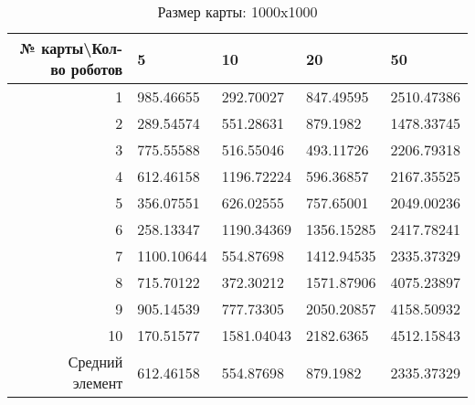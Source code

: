 \begin{table}[H]
\centering
\begin{tabular}{|r|l|l|l|l|}
\hline
№ карты\textbackslash Кол-во роботов & \textbf{5} & \textbf{10} & \textbf{20} & \textbf{50}\\ \hline
1 & 985.46655 & 292.70027 & 847.49595 & 2510.47386\\ \hline
2 & 289.54574 & 551.28631 & 879.1982 & 1478.33745\\ \hline
3 & 775.55588 & 516.55046 & 493.11726 & 2206.79318\\ \hline
4 & 612.46158 & 1196.72224 & 596.36857 & 2167.35525\\ \hline
5 & 356.07551 & 626.02555 & 757.65001 & 2049.00236\\ \hline
6 & 258.13347 & 1190.34369 & 1356.15285 & 2417.78241\\ \hline
7 & 1100.10644 & 554.87698 & 1412.94535 & 2335.37329\\ \hline
8 & 715.70122 & 372.30212 & 1571.87906 & 4075.23897\\ \hline
9 & 905.14539 & 777.73305 & 2050.20857 & 4158.50932\\ \hline
10 & 170.51577 & 1581.04043 & 2182.6365 & 4512.15843\\ \hline
Средний элемент & 612.46158 & 554.87698 & 879.1982 & 2335.37329\\ \hline
\end{tabular}
\caption*{Размер карты: 1000x1000}
\end{table}
